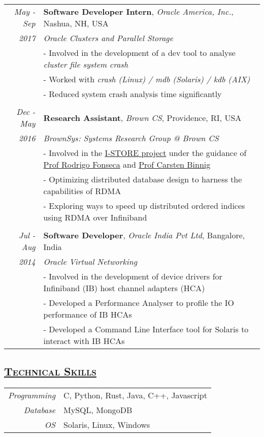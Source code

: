 \documentclass[14pt]{article}
\begin{document}
\begin{tabularx}{\textwidth}{r X}
\emph{May - Sep} & \textbf{Software Developer Intern}, \textit{Oracle America,
Inc.}, Nashua, NH, USA \\
\emph{2017 \enskip 2017}				 & \emph{Oracle Clusters and Parallel Storage}\\
					 & - Involved in the development of a dev tool to analyse \emph{cluster
					 file system crash} \\
					 & - Worked with \textit{crash (Linux) / mdb (Solaris) / kdb (AIX)} \\
					 & - Reduced system crash analysis time significantly \\
\\ 
\emph{Dec - May} & \textbf{Research Assistant}, \textit{Brown CS}, Providence, RI, USA \\
\emph{2016  \enskip 2017}                & \emph{BrownSys: Systems Research Group @ Brown CS}\\
                                         & - Involved in the \href{http://binnig.name/?page_id=33}{I-STORE project} under the guidance of \href{http://cs.brown.edu/~rfonseca/}{Prof Rodrigo Fonseca} and \href{http://binnig.name}{Prof Carsten Binnig}\\
					 & - Optimizing distributed database design to harness the capabilities of RDMA \\
                                         & - Exploring ways to speed up distributed ordered indices using RDMA over Infiniband \\
\\
\emph{Jul - Aug} & \textbf{Software Developer}, \textit{Oracle India Pvt Ltd}, Bangalore, India \\
\emph{2014  \enskip 2016}                & \emph{Oracle Virtual Networking}\\ 
			                 & - Involved in the development of device drivers for Infiniband (IB) host channel adapters (HCA)\\
			                 & - Developed a Performance Analyser to profile the IO performance of IB HCAs\\
			                 & - Developed a Command Line Interface tool for Solaris to interact with IB HCAs
\end{tabularx}


\subsection* {\scshape\Large\uline {Technical Skills}}
\begin{tabular}{r l}
\emph{Programming} & C, Python, Rust, Java, C++, Javascript \\
\emph{Database}	  & MySQL, MongoDB \\
\emph{OS} & Solaris, Linux, Windows
\end{tabular}
\end{document}
